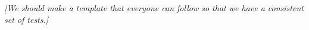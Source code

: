 \documentclass[modern]{desc-tex/styles/lsstdescnote}
\begin{document}
{\it [We should make a template that everyone can follow so that we have a consistent set of tests.]}

\begin{acknowledgments}

\end{acknowledgments}


\end{document}
